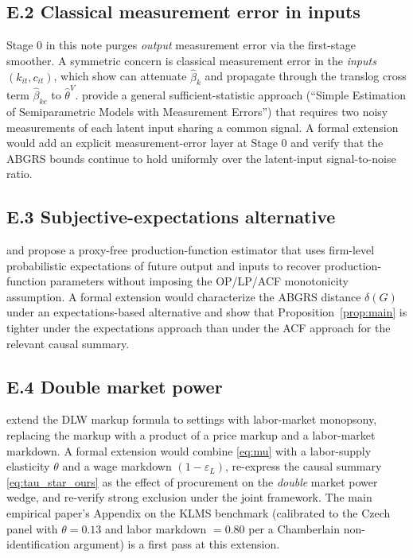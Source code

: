 \documentclass[11pt]{article}
\begin{document}
\subsection*{E.2 Classical measurement error in inputs}

Stage 0 in this note purges \emph{output} measurement error via the first-stage smoother. A symmetric concern is classical measurement error in the \emph{inputs} $(k_{it}, c_{it})$, which \citet{CWDLKvsOmega} show can attenuate $\hat\beta_k$ and propagate through the translog cross term $\hat\beta_{kc}$ to $\hat\theta^V$. \citet{EvdokimovZeleneev2025MERM} provide a general sufficient-statistic approach (``Simple Estimation of Semiparametric Models with Measurement Errors'') that requires two noisy measurements of each latent input sharing a common signal. A formal extension would add an explicit measurement-error layer at Stage 0 and verify that the ABGRS bounds continue to hold uniformly over the latent-input signal-to-noise ratio.

\subsection*{E.3 Subjective-expectations alternative}

\citet{NorrisKeillerdePaulaVanReenen2024} and \citet{BondEtAl2026POID} propose a proxy-free production-function estimator that uses firm-level probabilistic expectations of future output and inputs to recover production-function parameters without imposing the OP/LP/ACF monotonicity assumption. A formal extension would characterize the ABGRS distance $\delta(G)$ under an expectations-based alternative and show that Proposition~\ref{prop:main} is tighter under the expectations approach than under the ACF approach for the relevant causal summary.

\subsection*{E.4 Double market power}

\citet{KLMS2025} extend the DLW markup formula to settings with labor-market monopsony, replacing the markup with a product of a price markup and a labor-market markdown. A formal extension would combine \eqref{eq:mu} with a labor-supply elasticity $\theta$ and a wage markdown $(1-\varepsilon_L)$, re-express the causal summary \eqref{eq:tau_star_ours} as the effect of procurement on the \emph{double} market power wedge, and re-verify strong exclusion under the joint framework. The main empirical paper's Appendix on the KLMS benchmark (calibrated to the Czech panel with $\theta = 0.13$ and labor markdown $= 0.80$ per a Chamberlain non-identification argument) is a first pass at this extension.
\end{document}
